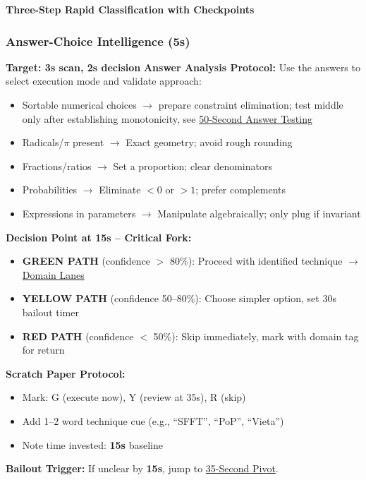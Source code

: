 \documentclass{article}
\newcommand{\immediateaction}[1]{\textbf{\textcolor{classifyred}{#1}}}
\newcommand{\timer}[1]{\textbf{\textcolor{timegreen}{#1}}}
\begin{document}
\begin{classifybox}{\immediateaction{Three-Step Rapid Classification with Checkpoints}}
\subsubsection{Answer-Choice Intelligence (5s)}
{\footnotesize\textcolor{timegreen}{}}\quad\textbf{Target: 3s scan, 2s decision}
\textbf{Answer Analysis Protocol:} Use the answers to select execution mode and validate approach:
\begin{itemize}[nosep]
\item Sortable numerical choices $\rightarrow$ prepare constraint elimination; test middle only after establishing monotonicity, see \hyperlink{answer-test-50}{50-Second Answer Testing}
\item Radicals/$\pi$ present $\rightarrow$ Exact geometry; avoid rough rounding
\item Fractions/ratios $\rightarrow$ Set a proportion; clear denominators
\item Probabilities $\rightarrow$ Eliminate $<0$ or $>1$; prefer complements
\item Expressions in parameters $\rightarrow$ Manipulate algebraically; only plug if invariant
\end{itemize}
\textbf{Decision Point at \timer{15s} -- Critical Fork:}
\begin{itemize}[nosep]
\item \textbf{GREEN PATH} (confidence $>$ 80\%): Proceed with identified technique $\rightarrow$ \hyperlink{domain-lanes}{Domain Lanes}
\item \textbf{YELLOW PATH} (confidence 50--80\%): Choose simpler option, set 30s bailout timer
\item \textbf{RED PATH} (confidence $<$ 50\%): Skip immediately, mark with domain tag for return
\end{itemize}
\textbf{Scratch Paper Protocol:}
\begin{itemize}[nosep]
\item Mark: \colorbox{green!20}{G} (execute now), \colorbox{yellow!20}{Y} (review at 35s), \colorbox{red!20}{R} (skip)
\item Add 1--2 word technique cue (e.g., ``SFFT'', ``PoP'', ``Vieta'')
\item Note time invested: \timer{15s} baseline
\end{itemize}
\smallskip
\textbf{Bailout Trigger:} If unclear by \timer{15s}, jump to \hyperlink{pivot35}{35-Second Pivot}.
\end{classifybox}
\end{document}
